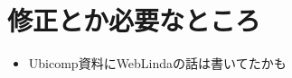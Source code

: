\section*{修正とか必要なところ}

\begin{itemize}
  \item Ubicomp資料\cite{shokai_furnitue}にWebLindaの話は書いてたかも
\end{itemize}
